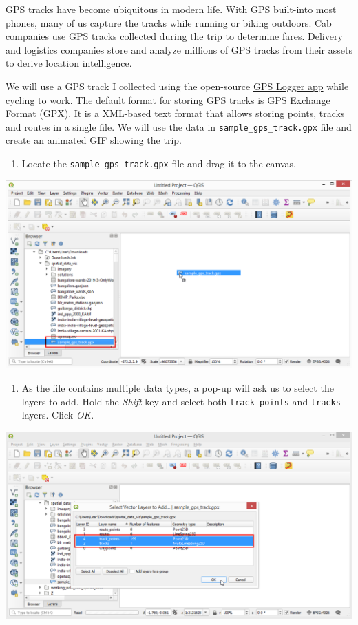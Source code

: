 \documentclass[
  12pt,
  a4paper]{article}
\providecommand{\tightlist}{%
  \setlength{\itemsep}{0pt}\setlength{\parskip}{0pt}}
\begin{document}
GPS tracks have become ubiquitous in modern life. With GPS built-into
most phones, many of us capture the tracks while running or biking
outdoors. Cab companies use GPS tracks collected during the trip to
determine fares. Delivery and logistics companies store and analyze
millions of GPS tracks from their assets to derive location
intelligence.

We will use a GPS track I collected using the open-source
\href{https://www.basicairdata.eu/projects/android/android-gps-logger/}{GPS
Logger app} while cycling to work. The default format for storing GPS
tracks is \href{https://en.wikipedia.org/wiki/GPS_Exchange_Format}{GPS
Exchange Format (GPX)}. It is a XML-based text format that allows
storing points, tracks and routes in a single file. We will use the data
in \texttt{sample\_gps\_track.gpx} file and create an animated GIF
showing the trip.

\begin{enumerate}
\def\labelenumi{\arabic{enumi}.}
\tightlist
\item
  Locate the \texttt{sample\_gps\_track.gpx} file and drag it to the
  canvas.
\end{enumerate}

\begin{center}\includegraphics[width=0.75\linewidth]{images/spatial_data_viz/gps1} \end{center}

\begin{enumerate}
\def\labelenumi{\arabic{enumi}.}
\setcounter{enumi}{1}
\tightlist
\item
  As the file contains multiple data types, a pop-up will ask us to
  select the layers to add. Hold the \emph{Shift} key and select both
  \texttt{track\_points} and \texttt{tracks} layers. Click \emph{OK}.
\end{enumerate}

\begin{center}\includegraphics[width=0.75\linewidth]{images/spatial_data_viz/gps2} \end{center}
\end{document}

